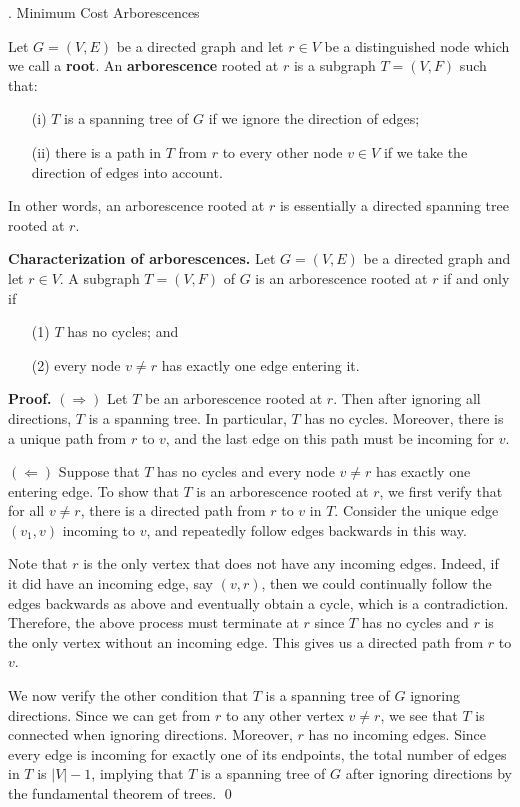 \documentclass{article}
\begin{document}
\newpage
\begin{center}
    {. Minimum Cost Arborescences}
\end{center}

Let $G = (V, E)$ be a directed graph and let $r \in V$ be a distinguished 
node which we call a {\bf root}. 
An {\bf arborescence} rooted at $r$ is a subgraph $T = (V, F)$ such that: 
\begin{enumerate}
    \item [(i)] $T$ is a spanning tree of $G$ if we ignore the direction of edges; 
    \item [(ii)] there is a path in $T$ from $r$ to every other node $v \in V$ 
    if we take the direction of edges into account. 
\end{enumerate}
In other words, an arborescence rooted at $r$ is essentially a directed spanning tree 
rooted at $r$. 

{\color{violet}
{\bf Characterization of arborescences.} Let $G = (V, E)$ 
be a directed graph and let $r \in V$. A subgraph $T = (V, F)$ of $G$ is 
an arborescence rooted at $r$ if and only if 
\begin{enumerate}
    \item [(1)] $T$ has no cycles; and 
    \item [(2)] every node $v \neq r$ has exactly one edge entering it. 
\end{enumerate}
}

{\color{blue} 
{\bf Proof.} $(\Rightarrow)$ Let $T$ be an arborescence rooted at $r$. Then 
after ignoring all directions, $T$ is a spanning tree. In particular, 
$T$ has no cycles. Moreover, there is a unique path from $r$ to $v$, and the 
last edge on this path must be incoming for $v$.

$(\Leftarrow)$ Suppose that $T$ has no cycles and every node $v \neq r$ 
has exactly one entering edge. To show that $T$ is an arborescence rooted at 
$r$, we first verify that for all $v \neq r$, there is a directed path from $r$ to 
$v$ in $T$. Consider the unique edge $(v_1, v)$ incoming to $v$, 
and repeatedly follow edges backwards in this way.

Note that $r$ is the only vertex that does not have any incoming edges. 
Indeed, if it did have an incoming edge, say $(v, r)$, then 
we could continually follow the edges backwards as above and 
eventually obtain a cycle, which is a contradiction. Therefore, 
the above process must terminate at $r$ since $T$ has no cycles and $r$ is the only vertex without an 
incoming edge. This gives us a directed path from $r$ to $v$. 

We now verify the other condition that $T$ is a spanning tree of $G$ 
ignoring directions. Since we can get from $r$ to any other vertex $v \neq r$, 
we see that $T$ is connected when ignoring directions. Moreover, $r$ 
has no incoming edges. Since every edge is incoming for exactly 
one of its endpoints, the total number of edges in $T$ is $|V| - 1$, 
implying that $T$ is a spanning tree of $G$ after ignoring directions 
by the fundamental theorem of trees. \qed 
}
\end{document}
